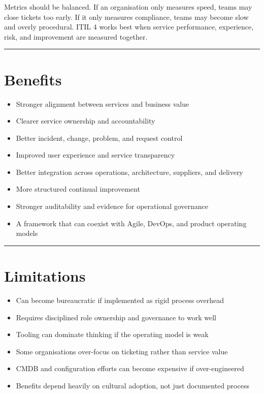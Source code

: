 \documentclass[
  letterpaper,
  DIV=11,
  numbers=noendperiod]{scrartcl}
\providecommand{\tightlist}{%
  \setlength{\itemsep}{0pt}\setlength{\parskip}{0pt}}
\begin{document}
Metrics should be balanced. If an organisation only measures speed,
teams may close tickets too early. If it only measures compliance, teams
may become slow and overly procedural. ITIL 4 works best when service
performance, experience, risk, and improvement are measured together.

\begin{center}\rule{0.5\linewidth}{0.5pt}\end{center}

\section{Benefits}\label{benefits}

\begin{itemize}
\tightlist
\item
  Stronger alignment between services and business value
\item
  Clearer service ownership and accountability
\item
  Better incident, change, problem, and request control
\item
  Improved user experience and service transparency
\item
  Better integration across operations, architecture, suppliers, and
  delivery
\item
  More structured continual improvement
\item
  Stronger auditability and evidence for operational governance
\item
  A framework that can coexist with Agile, DevOps, and product operating
  models
\end{itemize}

\begin{center}\rule{0.5\linewidth}{0.5pt}\end{center}

\section{Limitations}\label{limitations}

\begin{itemize}
\tightlist
\item
  Can become bureaucratic if implemented as rigid process overhead
\item
  Requires disciplined role ownership and governance to work well
\item
  Tooling can dominate thinking if the operating model is weak
\item
  Some organisations over-focus on ticketing rather than service value
\item
  CMDB and configuration efforts can become expensive if over-engineered
\item
  Benefits depend heavily on cultural adoption, not just documented
  process
\end{itemize}
\end{document}

